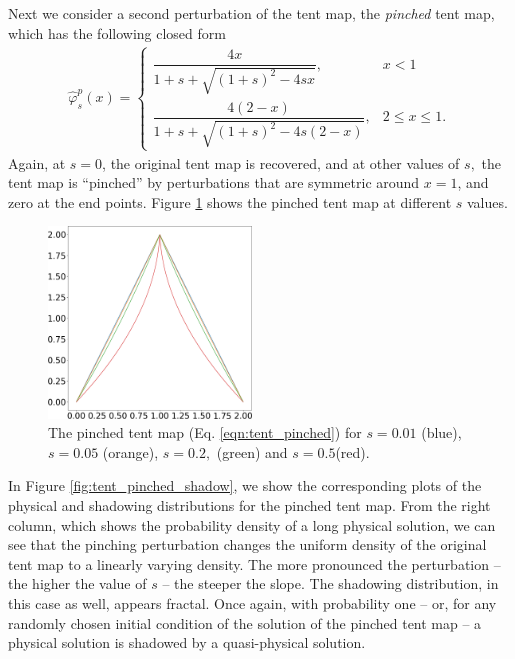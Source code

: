 Next we consider a second perturbation of the tent map, the \emph{pinched} tent map, which has the following closed form
\begin{align}
    \hat{\varphi}^p_s(x) = \begin{cases}
        \dfrac{4x}{1 + s + \sqrt{(1+s)^2 - 4s x} }, & x < 1 \\
        \dfrac{4(2-x)}{1 + s + \sqrt{(1+s)^2 - 4s(2- x)} }, & 2 \leq x \leq 1.
    \end{cases}
    \label{eqn:tent_pinched}
\end{align}
Again, at $s=0$, the original tent map is recovered, and at other values of $s,$ the tent map is ``pinched'' by perturbations that are symmetric around $x = 1$, and zero at the end points. Figure \ref{fig:tent_pinched} shows the pinched tent map at different $s$ values.  
\begin{figure}
    \centering
    \includegraphics[width=0.48\textwidth]{pinched_tent_map.png}
    \caption{The pinched tent map (Eq. \ref{eqn:tent_pinched}) for $s = 0.01$ (blue), $s=0.05$ (orange), $s=0.2,$ (green) and $s=0.5$(red).}
    \label{fig:tent_pinched}
\end{figure}
In Figure \ref{fig:tent_pinched_shadow}, we show the corresponding plots of the 
physical and shadowing distributions for the pinched tent map. From the right 
column, which shows the probability density of a long physical solution, we 
can see that the pinching perturbation changes the uniform density of the original tent map to a linearly varying density. The more pronounced the perturbation -- the higher the value of $s$ -- the steeper the slope. The shadowing distribution, in this case as well, appears fractal. Once again, with probability one -- or, for any randomly chosen initial condition of the solution of the pinched tent map -- a physical solution is shadowed by a quasi-physical solution.
